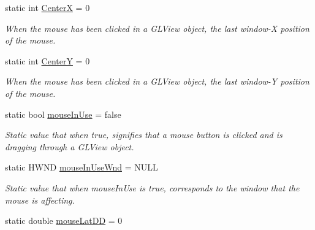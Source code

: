 \begin{DoxyCompactItemize}
\item 
\hypertarget{class_viewer3_d_ac7c5db8e849d9ff229af25f53f5c6877}{
static int \hyperlink{class_viewer3_d_ac7c5db8e849d9ff229af25f53f5c6877}{CenterX} = 0}
\label{class_viewer3_d_ac7c5db8e849d9ff229af25f53f5c6877}

\begin{DoxyCompactList}\small\item\em When the mouse has been clicked in a GLView object, the last window-\/X position of the mouse. \end{DoxyCompactList}\item 
\hypertarget{class_viewer3_d_ad5abad1421bcbddb245029db32eb1ca4}{
static int \hyperlink{class_viewer3_d_ad5abad1421bcbddb245029db32eb1ca4}{CenterY} = 0}
\label{class_viewer3_d_ad5abad1421bcbddb245029db32eb1ca4}

\begin{DoxyCompactList}\small\item\em When the mouse has been clicked in a GLView object, the last window-\/Y position of the mouse. \end{DoxyCompactList}\item 
\hypertarget{class_viewer3_d_abb9406a0a84bc7d17419bf488d84a4af}{
static bool \hyperlink{class_viewer3_d_abb9406a0a84bc7d17419bf488d84a4af}{mouseInUse} = false}
\label{class_viewer3_d_abb9406a0a84bc7d17419bf488d84a4af}

\begin{DoxyCompactList}\small\item\em Static value that when true, signifies that a mouse button is clicked and is dragging through a GLView object. \end{DoxyCompactList}\item 
\hypertarget{class_viewer3_d_a07128114d9a4ae8176b6a9911b57f6ad}{
static HWND \hyperlink{class_viewer3_d_a07128114d9a4ae8176b6a9911b57f6ad}{mouseInUseWnd} = NULL}
\label{class_viewer3_d_a07128114d9a4ae8176b6a9911b57f6ad}

\begin{DoxyCompactList}\small\item\em Static value that when mouseInUse is true, corresponds to the window that the mouse is affecting. \end{DoxyCompactList}\item 
\hypertarget{class_viewer3_d_abf391d256529f934e9d2201bc5795662}{
static double \hyperlink{class_viewer3_d_abf391d256529f934e9d2201bc5795662}{mouseLatDD} = 0}
\label{class_viewer3_d_abf391d256529f934e9d2201bc5795662}


\end{DoxyCompactItemize}

